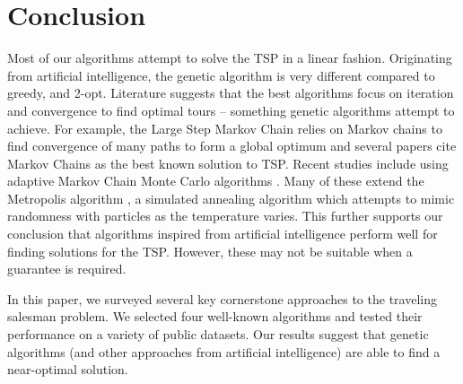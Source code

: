 \documentclass[10pt,twocolumn,letterpaper]{article}
\begin{document}
\section{Conclusion}\label{sec:conc}
Most of our algorithms attempt to solve the TSP in a
linear fashion. Originating from artificial intelligence, the
genetic algorithm is very different compared to greedy, and 2-opt. Literature suggests that the
best algorithms focus on iteration and convergence to find
optimal tours -- something genetic algorithms attempt to
achieve. For example, the Large Step Markov Chain \cite{hong1997improved}
relies on Markov chains to find convergence of many paths
to form a global optimum and several papers cite Markov
Chains as the best known solution to TSP. Recent studies include using adaptive Markov Chain Monte Carlo algorithms
\cite{qiu2008adaptive}. Many of these extend the Metropolis algorithm \cite{homaifar1992schema}, a
simulated annealing algorithm which attempts to mimic randomness with particles as the temperature varies. This further supports our conclusion that algorithms inspired from
artificial intelligence perform well for finding solutions for
the TSP. However, these may not be suitable when a guarantee is required.

In this paper, we surveyed several key cornerstone approaches to the traveling salesman problem. We selected
four well-known algorithms and tested their performance on
a variety of public datasets. Our results suggest that genetic algorithms (and other approaches from artificial intelligence) are able to find a near-optimal solution.

{\small


}
\end{document}

